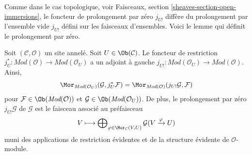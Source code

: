 \noindent
Comme dans le cas topologique, voir
Faisceaux, section \ref{sheaves-section-open-immersions},
le foncteur de prolongement par zéro $j_{U!}$ diffère du
prolongement par l'ensemble vide $j_{U!}$ défini sur les faisceaux
d'ensembles. Voici le lemme qui définit le prolongement par zéro.

\begin{lemma}
\label{lemma-extension-by-zero}
Soit $(\mathcal{C}, \mathcal{O})$ un site annelé.
Soit $U \in \Ob(\mathcal{C})$.
Le foncteur de restriction
$j_U^* : \textit{Mod}(\mathcal{O}) \to \textit{Mod}(\mathcal{O}_U)$
a un adjoint à gauche
$j_{U!} : \textit{Mod}(\mathcal{O}_U) \to \textit{Mod}(\mathcal{O})$.
Ainsi,
$$
\Mor_{\textit{Mod}(\mathcal{O}_U)}(\mathcal{G}, j_U^*\mathcal{F})
=
\Mor_{\textit{Mod}(\mathcal{O})}(j_{U!}\mathcal{G}, \mathcal{F})
$$
pour $\mathcal{F} \in \Ob(\textit{Mod}(\mathcal{O}))$
et $\mathcal{G} \in \Ob(\textit{Mod}(\mathcal{O}_U))$.
De plus, le prolongement par zéro $j_{U!}\mathcal{G}$ de $\mathcal{G}$
est le faisceau associé au préfaisceau
$$
V
\longmapsto
\bigoplus\nolimits_{\varphi \in \Mor_\mathcal{C}(V, U)}
\mathcal{G}(V \xrightarrow{\varphi} U)
$$
muni des applications de restriction évidentes et de la structure
évidente de $\mathcal{O}$-module.
\end{lemma}


